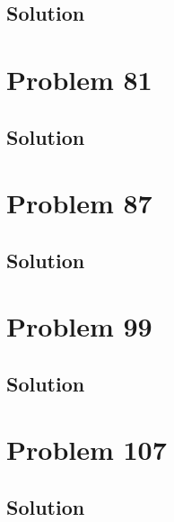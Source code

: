 \documentclass[12pt]{article}
\begin{document}
        \subsection{Solution}

    \pagebreak
    \section{Problem 81}

        \subsection{Solution}

    \pagebreak
    \section{Problem 87}

        \subsection{Solution}

    \pagebreak
    \section{Problem 99}

        \subsection{Solution}

    \pagebreak
    \section{Problem 107}

        \subsection{Solution}

    \pagebreak

    \tableofcontents
\end{document}
